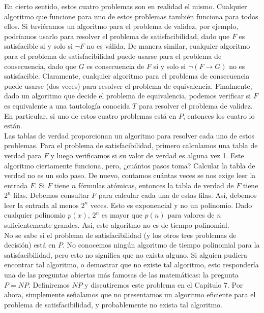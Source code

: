 \message{ !name(main.tex)}\documentclass[12pt,a4paper]{book}
\begin{document}
    En cierto sentido, estos cuatro problemas son en realidad el mismo. Cualquier algoritmo que funcione para uno de estos
    problemas también funciona para todos ellos. Si tuviéramos un algoritmo para el problema de validez, por ejemplo,
    podríamos usarlo para resolver el problema de satisfacibilidad, dado que $F$ es satisfacible si y solo si $\neg F$ no es
    válida. De manera similar, cualquier algoritmo para el problema de satisfacibilidad puede usarse para el problema de
    consecuencia, dado que $G$ es consecuencia de $F$ si y solo si $\neg(F\rightarrow G)$ no es satisfacible. Claramente,
    cualquier algoritmo para el problema de consecuencia puede usarse (dos veces) para resolver el problema de equivalencia.
    Finalmente, dado un algoritmo que decide el problema de equivalencia, podemos verificar si $F$ es equivalente a una
    tautología conocida $T$ para resolver el problema de validez. En particular, si uno de estos cuatro problemas está en
    $P$, entonces los cuatro lo están.\\
    Las tablas de verdad proporcionan un algoritmo para resolver cada uno de estos problemas. Para el problema de
    satisfacibilidad, primero calculamos una tabla de verdad para $F$ y luego verificamos si su valor de verdad es alguna vez
    1. Este algoritmo ciertamente funciona, pero, ¿cuántos pasos toma? Calcular la tabla de verdad no es un solo paso. De
    nuevo, contamos cuántas veces se nos exige leer la entrada $F$. Si $F$ tiene $n$ fórmulas atómicas, entonces la tabla de
    verdad de $F$ tiene $2^{n}$ filas. Debemos consultar $F$ para calcular cada una de estas filas. Así, debemos leer la
    entrada al menos $2^{n}$ veces. Esto es exponencial y no un polinomio. Dado cualquier polinomio $p(x)$, $2^{n}$ es mayor
    que $p(n)$ para valores de $n$ suficientemente grandes. Así, este algoritmo no es de tiempo polinomial.\\
    No se sabe si el problema de satisfacibilidad (y los otros tres problemas de decisión) está en $P$. No conocemos ningún
    algoritmo de tiempo polinomial para la satisfacibilidad, pero esto no significa que no exista alguno. Si alguien pudiera
    encontrar tal algoritmo, o demostrar que no existe tal algoritmo, esto respondería una de las preguntas abiertas más
    famosas de las matemáticas: la pregunta $P=NP$. Definiremos $NP$ y discutiremos este problema en el Capítulo 7. Por
    ahora, simplemente señalamos que no presentamos un algoritmo eficiente para el problema de satisfacibilidad, y
    probablemente no exista tal algoritmo.\\
\end{document}
